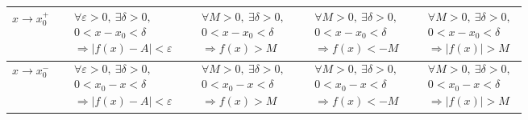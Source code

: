 \documentclass[../book.tex]{subfiles}
\begin{document}
\begin{enumerate}
\begin{tabular}{|c|p{3.2cm}|p{3.2cm}|p{3.2cm}|p{3.2cm}|}
            $x\to x_0^+$
            & $\begin{aligned}
                   &\forall\varepsilon>0,\ \exists\delta>0,\\
                   &0<x-x_0<\delta\\
                   &\Rightarrow |f(x)-A|<\varepsilon
            \end{aligned}$
            & $\begin{aligned}
                   &\forall M>0,\ \exists\delta>0,\\
                   &0<x-x_0<\delta\\
                   &\Rightarrow f(x)>M
            \end{aligned}$
            & $\begin{aligned}
                   &\forall M>0,\ \exists\delta>0,\\
                   &0<x-x_0<\delta\\
                   &\Rightarrow f(x)<-M
            \end{aligned}$
            & $\begin{aligned}
                   &\forall M>0,\ \exists\delta>0,\\
                   &0<x-x_0<\delta\\
                   &\Rightarrow |f(x)|>M
            \end{aligned}$
            \\ \hline

            $x\to x_0^-$
            & $\begin{aligned}
                   &\forall\varepsilon>0,\ \exists\delta>0,\\
                   &0<x_0-x<\delta\\
                   &\Rightarrow |f(x)-A|<\varepsilon
            \end{aligned}$
            & $\begin{aligned}
                   &\forall M>0,\ \exists\delta>0,\\
                   &0<x_0-x<\delta\\
                   &\Rightarrow f(x)>M
            \end{aligned}$
            & $\begin{aligned}
                   &\forall M>0,\ \exists\delta>0,\\
                   &0<x_0-x<\delta\\
                   &\Rightarrow f(x)<-M
            \end{aligned}$
            & $\begin{aligned}
                   &\forall M>0,\ \exists\delta>0,\\
                   &0<x_0-x<\delta\\
                   &\Rightarrow |f(x)|>M
            \end{aligned}$
            \\ \hline


\end{tabular}
\end{enumerate}
\end{document}
